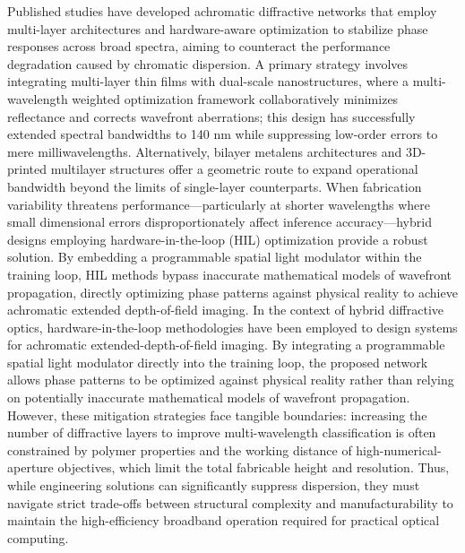 \documentclass[11pt]{article}
\begin{document}
Published studies have developed achromatic diffractive networks that employ multi-layer architectures and hardware-aware optimization to stabilize phase responses across broad spectra, aiming to counteract the performance degradation caused by chromatic dispersion. A primary strategy involves integrating multi-layer thin films with dual-scale nanostructures, where a multi-wavelength weighted optimization framework collaboratively minimizes reflectance and corrects wavefront aberrations; this design has successfully extended spectral bandwidths to 140 nm while suppressing low-order errors to mere milliwavelengths. Alternatively, bilayer metalens architectures and 3D-printed multilayer structures offer a geometric route to expand operational bandwidth beyond the limits of single-layer counterparts. When fabrication variability threatens performance---particularly at shorter wavelengths where small dimensional errors disproportionately affect inference accuracy---hybrid designs employing hardware-in-the-loop (HIL) optimization provide a robust solution. By embedding a programmable spatial light modulator within the training loop, HIL methods bypass inaccurate mathematical models of wavefront propagation, directly optimizing phase patterns against physical reality to achieve achromatic extended depth-of-field imaging. In the context of hybrid diffractive optics, hardware-in-the-loop methodologies have been employed to design systems for achromatic extended-depth-of-field imaging. By integrating a programmable spatial light modulator directly into the training loop, the proposed network allows phase patterns to be optimized against physical reality rather than relying on potentially inaccurate mathematical models of wavefront propagation. \citep{doi_10_1364_oe_461549_b2d41b3f} However, these mitigation strategies face tangible boundaries: increasing the number of diffractive layers to improve multi-wavelength classification is often constrained by polymer properties and the working distance of high-numerical-aperture objectives, which limit the total fabricable height and resolution. Thus, while engineering solutions can significantly suppress dispersion, they must navigate strict trade-offs between structural complexity and manufacturability to maintain the high-efficiency broadband operation required for practical optical computing. \citep{doi_10_1002_adpr_202300310_6647aa64} \citep{doi_10_3390_modelling7010029_9851fe61} \citep{doi_10_1364_oe_461549_b2d41b3f} \citep{doi_10_29026_oea_2021_200008_8948c2c3} \citep{doi_10_1126_sciadv_adj9262_15884f2e}
\end{document}

